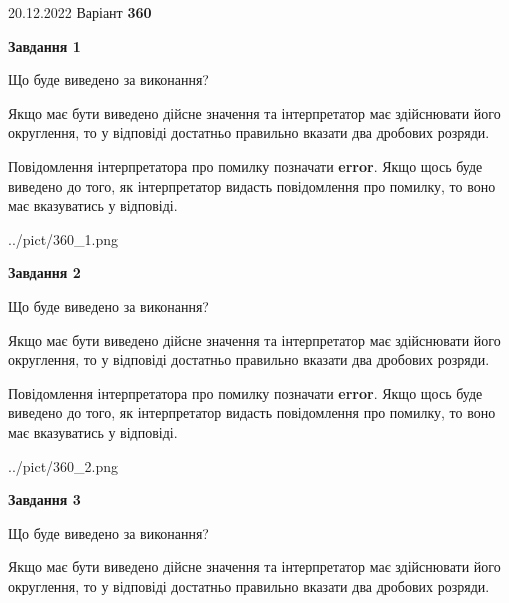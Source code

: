 \documentclass[12pt, ukrainian]{article}
\begin{document}
{20.12.2022 Варіант \No \textbf { 360 }\par}
{
\begin {Large}

{\begin {center}\textbf{Завдання 1}\end {center}}\par
Що буде виведено за виконання? \par

Якщо має бути виведено дійсне значення та інтерпретатор має здійснювати його округлення, 
то у відповіді достатньо правильно вказати два дробових розряди.

Повідомлення інтерпретатора про помилку позначати \textbf{error}.
Якщо щось буде виведено до того, як інтерпретатор видасть повідомлення про помилку, 
то воно має вказуватись у відповіді. \par

\begin{center}
	{../pict/360_1.png}
\end{center}
\newpage

{\begin {center}\textbf{Завдання 2}\end {center}}\par
Що буде виведено за виконання? \par

Якщо має бути виведено дійсне значення та інтерпретатор має здійснювати його округлення, 
то у відповіді достатньо правильно вказати два дробових розряди.

Повідомлення інтерпретатора про помилку позначати \textbf{error}.
Якщо щось буде виведено до того, як інтерпретатор видасть повідомлення про помилку, 
то воно має вказуватись у відповіді. \par

\begin{center}
	{../pict/360_2.png}
\end{center}
\newpage

{\begin {center}\textbf{Завдання 3}\end {center}}\par
Що буде виведено за виконання? \par

Якщо має бути виведено дійсне значення та інтерпретатор має здійснювати його округлення, 
то у відповіді достатньо правильно вказати два дробових розряди.


\end{Large}}
\end{document}
